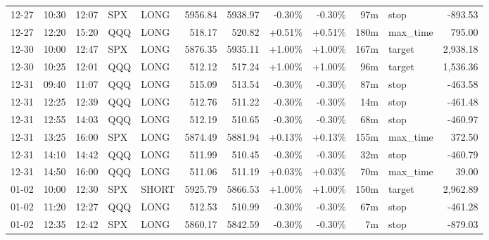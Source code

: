 \documentclass[11pt,a4paper]{article}
\begin{document}
\begin{center}
\begin{longtable}{>{\color{txtmain}}l l l l l r r r r r >{\color{txtmain}}l r}
12-27 & 10:30 & 12:07 & SPX & LONG & 5956.84 & 5938.97 & \textcolor{lossred}{-0.30\%} & \textcolor{lossred}{-0.30\%} & 97m & stop & \textcolor{lossred}{-893.53} \\
12-27 & 12:20 & 15:20 & QQQ & LONG & 518.17 & 520.82 & \textcolor{wingreen}{+0.51\%} & \textcolor{wingreen}{+0.51\%} & 180m & max\_time & \textcolor{wingreen}{795.00} \\
12-30 & 10:00 & 12:47 & SPX & LONG & 5876.35 & 5935.11 & \textcolor{wingreen}{+1.00\%} & \textcolor{wingreen}{+1.00\%} & 167m & target & \textcolor{wingreen}{2,938.18} \\
12-30 & 10:25 & 12:01 & QQQ & LONG & 512.12 & 517.24 & \textcolor{wingreen}{+1.00\%} & \textcolor{wingreen}{+1.00\%} & 96m & target & \textcolor{wingreen}{1,536.36} \\
12-31 & 09:40 & 11:07 & QQQ & LONG & 515.09 & 513.54 & \textcolor{lossred}{-0.30\%} & \textcolor{lossred}{-0.30\%} & 87m & stop & \textcolor{lossred}{-463.58} \\
12-31 & 12:25 & 12:39 & QQQ & LONG & 512.76 & 511.22 & \textcolor{lossred}{-0.30\%} & \textcolor{lossred}{-0.30\%} & 14m & stop & \textcolor{lossred}{-461.48} \\
12-31 & 12:55 & 14:03 & QQQ & LONG & 512.19 & 510.65 & \textcolor{lossred}{-0.30\%} & \textcolor{lossred}{-0.30\%} & 68m & stop & \textcolor{lossred}{-460.97} \\
12-31 & 13:25 & 16:00 & SPX & LONG & 5874.49 & 5881.94 & \textcolor{wingreen}{+0.13\%} & \textcolor{wingreen}{+0.13\%} & 155m & max\_time & \textcolor{wingreen}{372.50} \\
12-31 & 14:10 & 14:42 & QQQ & LONG & 511.99 & 510.45 & \textcolor{lossred}{-0.30\%} & \textcolor{lossred}{-0.30\%} & 32m & stop & \textcolor{lossred}{-460.79} \\
12-31 & 14:50 & 16:00 & QQQ & LONG & 511.06 & 511.19 & \textcolor{wingreen}{+0.03\%} & \textcolor{wingreen}{+0.03\%} & 70m & max\_time & \textcolor{wingreen}{39.00} \\
01-02 & 10:00 & 12:30 & SPX & SHORT & 5925.79 & 5866.53 & \textcolor{wingreen}{+1.00\%} & \textcolor{wingreen}{+1.00\%} & 150m & target & \textcolor{wingreen}{2,962.89} \\
01-02 & 11:20 & 12:27 & QQQ & LONG & 512.53 & 510.99 & \textcolor{lossred}{-0.30\%} & \textcolor{lossred}{-0.30\%} & 67m & stop & \textcolor{lossred}{-461.28} \\
01-02 & 12:35 & 12:42 & SPX & LONG & 5860.17 & 5842.59 & \textcolor{lossred}{-0.30\%} & \textcolor{lossred}{-0.30\%} & 7m & stop & \textcolor{lossred}{-879.03} \\

\end{longtable}
\end{center}
\end{document}
